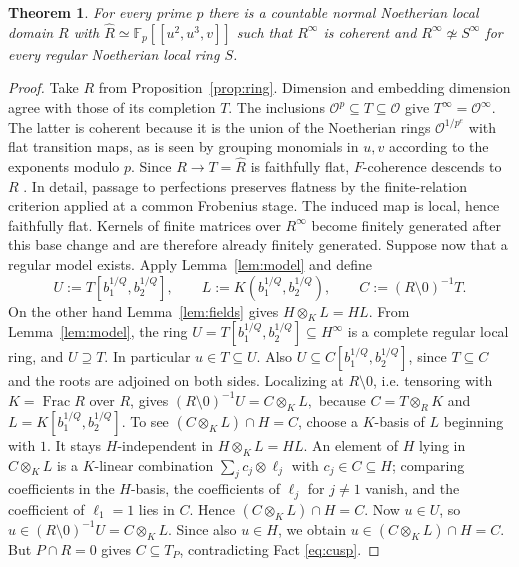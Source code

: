 \documentclass[11pt,a4paper]{amsart}
\numberwithin{equation}{section}
\newtheorem{theorem}{Theorem}[section]
\newcommand{\Frac}{\operatorname{Frac}}
\newcommand{\F}{\mathbb F}
\newcommand{\perf}{^{\infty}}
\begin{document}
	\begin{theorem}\label{thm:main}
	For every prime $p$ there is a countable normal Noetherian local
domain $R$ with
$\widehat R\simeq \F_p[[u^2,u^3,v]]$
such that $R\perf$ is coherent and $R\perf\not\simeq S\perf$ for
every regular Noetherian local ring $S$.
\end{theorem}

 	
\begin{proof} 
Take $R$ from Proposition~\ref{prop:ring}. Dimension and embedding
dimension agree with those of its completion $T$. The inclusions
	$	\mathcal{O}^p\subseteq T\subseteq 	\mathcal{O}$ give $T\perf=	\mathcal{O}\perf$.
The latter is coherent because it is the union of the Noetherian rings
$	\mathcal{O}^{1/p^e}$ with flat transition maps, as is seen by grouping monomials in $u,v$ according to the exponents modulo $p$.
Since $R\to T=\widehat R$ is faithfully flat, $F$-coherence
	descends to $R$ \cite[\S 3]{Shim}. In detail, passage to
perfections preserves flatness by the finite-relation criterion
applied at a common Frobenius stage. The induced map is local, hence
faithfully flat. Kernels of finite matrices over $R\perf$ become
finitely generated after this base change and are therefore already
finitely generated.
Suppose now that a regular model exists. Apply Lemma~\ref{lem:model}
and define	$$U:=T[b_1^{1/Q},b_2^{1/Q}],\qquad
L:=K(b_1^{1/Q},b_2^{1/Q}),\qquad
C:=(R\setminus 0)^{-1}T .	$$On the other hand Lemma~\ref{lem:fields} gives $H\otimes_K L=HL$. From Lemma~\ref{lem:model}, the ring
$	U=T[b_1^{1/Q},b_2^{1/Q}]\subseteq H^\infty$
is a complete regular local ring, and \(U\supseteq T\). In particular
$u\in T\subseteq U.$
Also \(U\subseteq C[b_1^{1/Q},b_2^{1/Q}]\), since \(T\subseteq C\) and the
roots are adjoined on both sides. Localizing at \(R\setminus0\), i.e.
tensoring with \(K=\Frac R\) over \(R\), gives
$(R\setminus0)^{-1}U=C\otimes_K L,$
because \(C=T\otimes_R K\) and \(L=K[b_1^{1/Q},b_2^{1/Q}]\).
To see $(C\otimes_K L)\cap H=C$, choose a \(K\)-basis of \(L\) beginning with \(1\). It stays \(H\)-independent in \(H\otimes_K L=HL\). An element of \(H\) lying in \(C\otimes_K L\) is a \(K\)-linear combination
\(\sum_j c_j\otimes\ell_j\) with \(c_j\in C\subseteq H\); comparing
coefficients in the \(H\)-basis, the coefficients of \(\ell_j\) for
	\(j\neq1\) vanish, and the coefficient of \(\ell_1=1\) lies in \(C\).
Hence
$ 	(C\otimes_K L)\cap H=C .$
Now \(u\in U\), so  
$u\in (R\setminus0)^{-1}U=C\otimes_K L .$
	Since also \(u\in H\), we obtain 
$u\in (C\otimes_K L)\cap H=C$.
But $P\cap R=0$ gives $C\subseteq T_P$,
	contradicting Fact \ref{eq:cusp}.\end{proof}
 	
\end{document}

